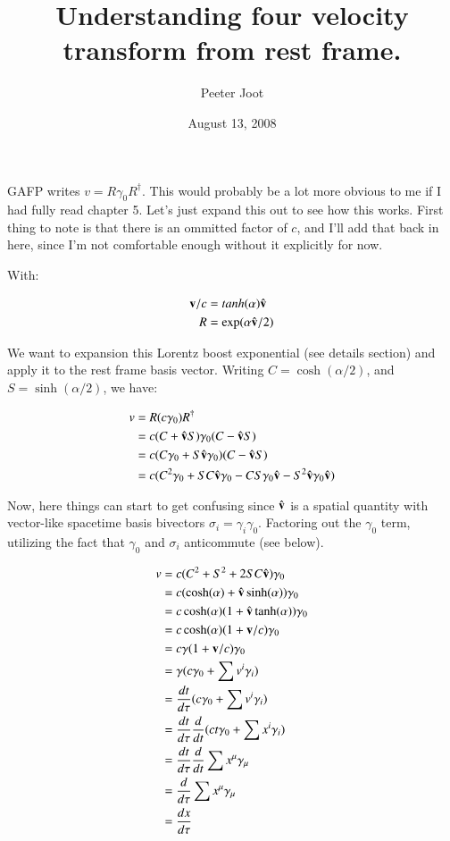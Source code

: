 \documentclass{article}      %
\title{Understanding four velocity transform from rest frame.}
\author{Peeter Joot}
\date{August 13, 2008}
\begin{document}

\maketitle{}

\section{}

GAFP writes $v = R \gamma_0 R^\dagger$.  This would probably be a lot more
obvious to me if I had fully read chapter 5.  Let's just expand this out
to see how this works.  First thing to note is that there is an ommitted factor
of $c$, and I'll add that back in here, since I'm not comfortable enough
without it explicitly for now.

With:

\begin{align*}
\mathbf{v}/c &= tanh(\alpha)\hat{\mathbf{v}} \\
R &= \exp(\alpha \hat{\mathbf{v}}/2)
\end{align*}

We want to expansion this Lorentz boost exponential (see details section) and apply it to the rest frame basis vector.  Writing
$C = \cosh(\alpha/2)$, and $S = \sinh(\alpha/2)$, we have:

\begin{align*}
v
&= R (c \gamma_0) R^\dagger \\
&= c (C + \hat{\mathbf{v}} S) \gamma_0 (C - \hat{\mathbf{v}} S) \\
&= c (C \gamma_0 + S \hat{\mathbf{v}} \gamma_0) (C - \hat{\mathbf{v}} S) \\
&= c ( C^2 \gamma_0 + SC \hat{\mathbf{v}} \gamma_0 -CS \gamma_0\hat{\mathbf{v}} - S^2 \hat{\mathbf{v}} \gamma_0 \hat{\mathbf{v}} ) \\
\end{align*}

Now, here things can start to get confusing since $\hat{\mathbf{v}}$ is a spatial quantity with vector-like spacetime basis bivectors $\sigma_i = \gamma_i \gamma_0$.  Factoring out the $\gamma_0$ term, utilizing the fact that $\gamma_0$ and $\sigma_i$ anticommute (see below).

\begin{align*}
v
&= c ( C^2 + S^2 + 2 SC \hat{\mathbf{v}} ) \gamma_0 \\
&= c ( \cosh(\alpha) + \hat{\mathbf{v}} \sinh(\alpha) ) \gamma_0 \\
&= c \cosh(\alpha) ( 1 + \hat{\mathbf{v}} \tanh(\alpha) ) \gamma_0 \\
&= c \cosh(\alpha) ( 1 + \mathbf{v}/c ) \gamma_0 \\
&= c \gamma ( 1 + \mathbf{v}/c ) \gamma_0 \\
&= \gamma ( c \gamma_0 + \sum v^i \gamma_i) \\
&= \frac{dt}{d\tau}( c \gamma_0 + \sum v^i \gamma_i) \\
&= \frac{dt}{d\tau} \frac{d}{dt}( c t \gamma_0 + \sum x^i \gamma_i) \\
&= \frac{dt}{d\tau} \frac{d}{dt} \sum x^{\mu} \gamma_{\mu} \\
&= \frac{d}{d\tau} \sum x^{\mu} \gamma_{\mu} \\
&= \frac{dx}{d\tau}
\end{align*}
\end{document}
